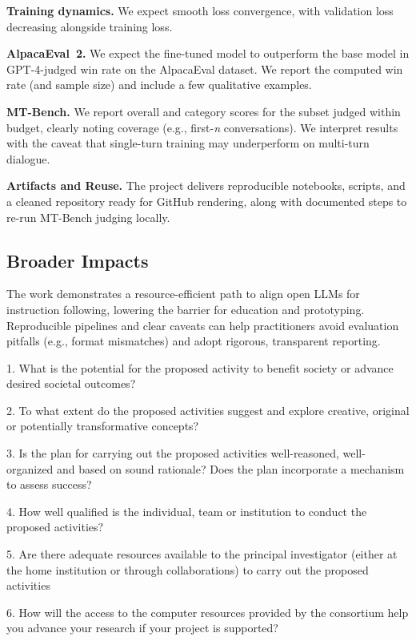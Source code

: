 \documentclass{assignment7_report}
\begin{document}
\textbf{Training dynamics.} We expect smooth loss convergence, with validation loss decreasing alongside training loss.

\textbf{AlpacaEval~2.} We expect the fine-tuned model to outperform the base model in GPT-4-judged win rate on the AlpacaEval dataset. We report the computed win rate (and sample size) and include a few qualitative examples.

\textbf{MT-Bench.} We report overall and category scores for the subset judged within budget, clearly noting coverage (e.g., first-\emph{n} conversations). We interpret results with the caveat that single-turn training may underperform on multi-turn dialogue.

\textbf{Artifacts and Reuse.} The project delivers reproducible notebooks, scripts, and a cleaned repository ready for GitHub rendering, along with documented steps to re-run MT-Bench judging locally.

\subsection{Broader Impacts}


The work demonstrates a resource-efficient path to align open LLMs for instruction following, lowering the barrier for education and prototyping. Reproducible pipelines and clear caveats can help practitioners avoid evaluation pitfalls (e.g., format mismatches) and adopt rigorous, transparent reporting.


1. What is the potential for the proposed activity to benefit society or advance desired societal outcomes?

2. To what extent do the proposed activities suggest and explore creative, original or potentially transformative concepts?

3. Is the plan for carrying out the proposed activities well-reasoned, well-organized and based on sound rationale? Does the plan incorporate a mechanism to assess success?

4. How well qualified is the individual, team or institution to conduct the proposed activities?

5. Are there adequate resources available to the principal investigator (either at the home institution or through collaborations) to carry out the proposed activities

6. How will the access to the computer resources provided by the consortium help you advance your research if your project is supported?
\end{document}
